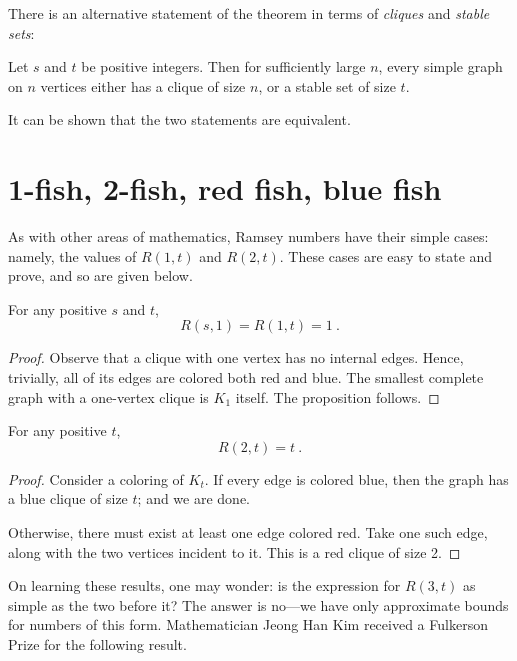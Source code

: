 \documentclass{article}
\begin{document}
There is an alternative statement of the theorem in terms of \textit{cliques} and \textit{stable sets}:

\begin{Theorem}
    Let $s$ and $t$ be positive integers. Then for sufficiently large $n$, every simple graph on $n$ vertices either has a clique of size $n$, or a stable set of size $t$.
\end{Theorem}

It can be shown that the two statements are equivalent.

\section{1-fish, 2-fish, red fish, blue fish}

As with other areas of mathematics, Ramsey numbers have their simple cases: namely, the values of $R(1,t)$ and $R(2,t)$. These cases are easy to state and prove, and so are given below.

\begin{Proposition}
    For any positive $s$ and $t$,
    \[ R(s,1) = R(1,t) = 1 \ . \]
\end{Proposition}

\begin{proof}
    Observe that a clique with one vertex has no internal edges. Hence, trivially, all of its edges are colored both red and blue. The smallest complete graph with a one-vertex clique is $K_1$ itself. The proposition follows.
\end{proof}

\begin{Proposition}
    For any positive $t$,
    \[ R(2,t) = t \ . \]
\end{Proposition}

\begin{proof}
    Consider a coloring of $K_t$. If every edge is colored blue, then the graph has a blue clique of size $t$; and we are done.

    Otherwise, there must exist at least one edge colored red. Take one such edge, along with the two vertices incident to it. This is a red clique of size 2.
\end{proof}

On learning these results, one may wonder: is the expression for $R(3,t)$ as simple as the two before it? The answer is no---we have only approximate bounds for numbers of this form. Mathematician Jeong Han Kim received a Fulkerson Prize for the following result.
\end{document}
